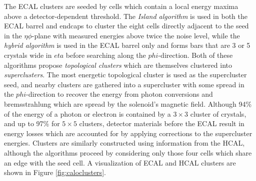 The ECAL clusters are seeded by cells which contain a local energy maxima above a detector-dependent threshold. The \textit{Island algorithm} is used in both the ECAL barrel and endcaps to cluster the eight cells directly adjacent to the seed in the $\eta\phi$-plane with measured energies above twice the noise level, while the \textit{hybrid algorithm} is used in the ECAL barrel only and forms bars that are 3 or 5 crystals wide in $eta$ before searching along the $phi$-direction. Both of these algorithms propose \textit{topological clusters} which are themselves clustered into \textit{superclusters}. The most energetic topological cluster is used as the supercluster seed, and nearby clusters are gathered into a supercluster with some spread in the $phi$-direction to recover the energy from photon conversions and bremsstrahlung which are spread by the solenoid's magnetic field. Although 94\% of the energy of a photon or electron is contained by a $3\times3$ cluster of crystals, and up to 97\% for $5\times5$ clusters, detector materials before the ECAL result in energy losses which are accounted for by applying corrections to the supercluster energies. Clusters are similarly constructed using information from the HCAL, although the algorithms proceed by considering only those four cells which share an edge with the seed cell. A visualization of ECAL and HCAL clusters are shown in Figure \ref{fig:caloclusters}.

